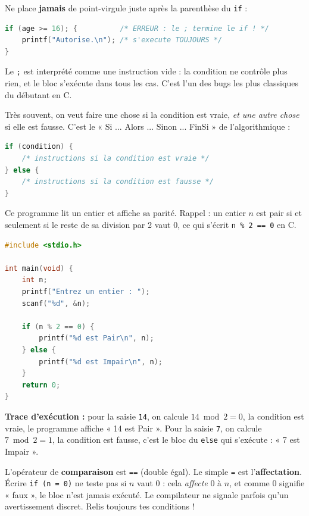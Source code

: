 \documentclass[11pt]{article}
\newcounter{popsec}
\newcounter{popsub}
\newcommand{\courssub}[1]{%
  \stepcounter{popsub}%
  \par\vspace{9pt}\noindent{\popxbold\fontsize{11.5}{13}\selectfont\color{popink}{\color{poporange}\thepopsec.\thepopsub}\hspace{6pt}#1}\par\nopagebreak\vspace{4pt}
}
\begin{document}
\begin{attention}
Ne place \textbf{jamais} de point-virgule juste après la parenthèse du \texttt{if} :
\begin{lstlisting}[language=C]
if (age >= 16); {          /* ERREUR : le ; termine le if ! */
    printf("Autorise.\n"); /* s'execute TOUJOURS */
}
\end{lstlisting}
Le \texttt{;} est interprété comme une instruction vide : la condition ne contrôle plus rien, et le bloc s'exécute dans tous les cas. C'est l'un des bugs les plus classiques du débutant en C.
\end{attention}

\courssub{L'instruction \texttt{if ... else}}

Très souvent, on veut faire une chose si la condition est vraie, \emph{et une autre chose} si elle est fausse. C'est le « Si ... Alors ... Sinon ... FinSi » de l'algorithmique :

\begin{lstlisting}[language=C]
if (condition) {
    /* instructions si la condition est vraie */
} else {
    /* instructions si la condition est fausse */
}
\end{lstlisting}

\begin{exemplebox}
Ce programme lit un entier et affiche sa parité. Rappel : un entier $n$ est pair si et seulement si le reste de sa division par 2 vaut 0, ce qui s'écrit \texttt{n \% 2 == 0} en C.
\begin{lstlisting}[language=C]
#include <stdio.h>

int main(void) {
    int n;
    printf("Entrez un entier : ");
    scanf("%d", &n);

    if (n % 2 == 0) {
        printf("%d est Pair\n", n);
    } else {
        printf("%d est Impair\n", n);
    }
    return 0;
}
\end{lstlisting}
\textbf{Trace d'exécution :} pour la saisie \texttt{14}, on calcule $14 \bmod 2 = 0$, la condition est vraie, le programme affiche « 14 est Pair ». Pour la saisie \texttt{7}, on calcule $7 \bmod 2 = 1$, la condition est fausse, c'est le bloc du \texttt{else} qui s'exécute : « 7 est Impair ».
\end{exemplebox}

\begin{attention}[Confondre \texttt{=} et \texttt{==}]
L'opérateur de \textbf{comparaison} est \texttt{==} (double égal). Le simple \texttt{=} est l'\textbf{affectation}. Écrire \texttt{if (n = 0)} ne teste pas si $n$ vaut 0 : cela \emph{affecte} 0 à $n$, et comme 0 signifie « faux », le bloc n'est jamais exécuté. Le compilateur ne signale parfois qu'un avertissement discret. Relis toujours tes conditions !
\end{attention}
\end{document}
